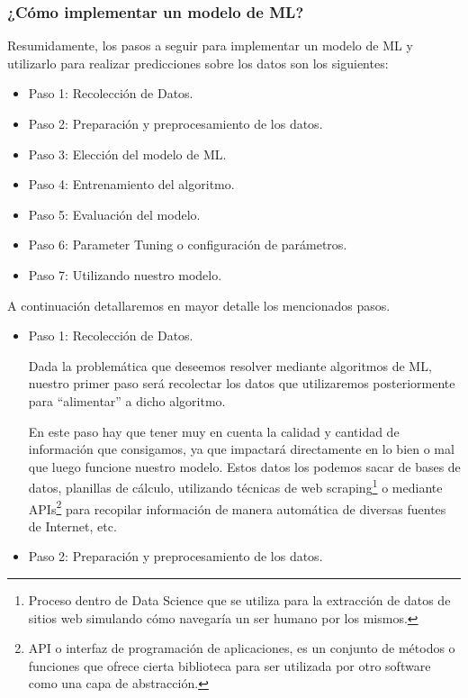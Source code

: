\documentclass[12pt,a4paper]{article}
\begin{document}
\begin{sloppypar}
\cleardoublepage
\subsubsection{¿Cómo implementar un modelo de ML?}\label{implementar_mod_ML}

Resumidamente, los pasos a seguir para implementar un modelo de ML y utilizarlo para realizar predicciones sobre los datos son los siguientes:
\begin{itemize}
\item Paso 1: Recolección de Datos.
\item Paso 2: Preparación y preprocesamiento de los datos.
\item Paso 3: Elección del modelo de ML.
\item Paso 4: Entrenamiento del algoritmo.
\item Paso 5: Evaluación del modelo.
\item Paso 6: Parameter Tuning o configuración de parámetros.
\item Paso 7: Utilizando nuestro modelo.\\
\end{itemize}

A continuación detallaremos en mayor detalle los mencionados pasos.

\begin{itemize}
\item Paso 1: Recolección de Datos.

Dada la problemática que deseemos resolver mediante algoritmos de ML, nuestro primer paso será recolectar los datos que utilizaremos posteriormente para “alimentar” a dicho algoritmo. 

En este paso hay que tener muy en cuenta la calidad y cantidad de información que consigamos, ya que impactará directamente en lo bien o mal que luego funcione nuestro modelo. Estos datos los podemos sacar de bases de datos, planillas de cálculo, utilizando técnicas de web scraping\footnote{Proceso dentro de Data Science que se utiliza para la extracción de datos de sitios web simulando cómo navegaría un ser humano por los mismos.} o mediante APIs\footnote{API o interfaz de programación de aplicaciones, es un conjunto de métodos o funciones que ofrece cierta biblioteca para ser utilizada por otro software como una capa de abstracción.} para recopilar información de manera automática de diversas fuentes de Internet, etc.\\

\item Paso 2: Preparación y preprocesamiento de los datos.


\end{itemize}
\end{sloppypar}
\end{document}
